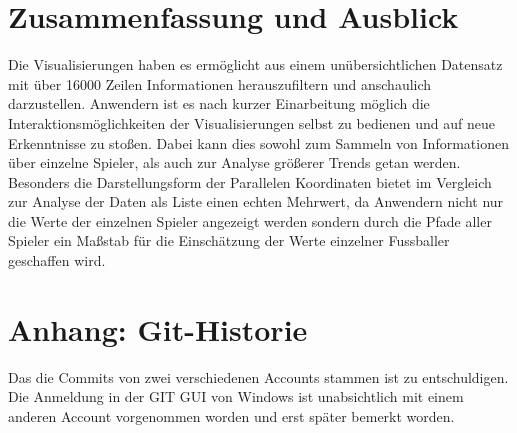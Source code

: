 \documentclass[usegeometry=true]{scrartcl}
\begin{document}
\section{Zusammenfassung und Ausblick}
Die Visualisierungen haben es ermöglicht aus einem unübersichtlichen Datensatz mit über 16000 Zeilen Informationen herauszufiltern und anschaulich darzustellen.
Anwendern ist es nach kurzer Einarbeitung möglich die Interaktionsmöglichkeiten der Visualisierungen selbst zu bedienen und auf neue Erkenntnisse zu stoßen. Dabei kann dies sowohl zum Sammeln von Informationen über einzelne Spieler, als auch zur Analyse größerer Trends getan werden. Besonders die Darstellungsform der Parallelen Koordinaten bietet im Vergleich zur Analyse der Daten als Liste einen echten Mehrwert, da Anwendern nicht nur die Werte der einzelnen Spieler angezeigt werden sondern durch die Pfade aller Spieler ein Maßstab für die Einschätzung der Werte einzelner Fussballer geschaffen wird.




\newpage

\setcounter{page}{4}
\section*{Anhang: Git-Historie}
Das die Commits von zwei verschiedenen Accounts stammen ist zu entschuldigen. Die Anmeldung in der GIT GUI von Windows ist unabsichtlich mit einem anderen Account vorgenommen worden und erst später bemerkt worden.
\end{document}
